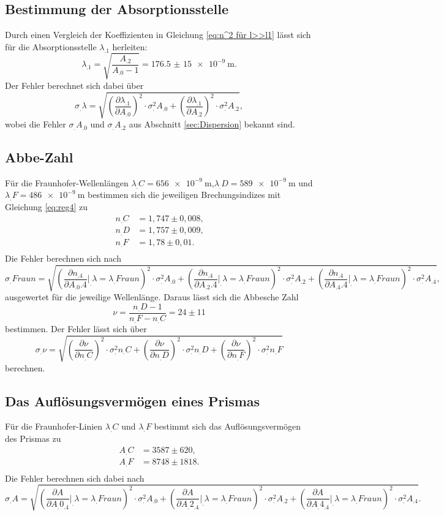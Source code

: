 \subsection{Bestimmung der Absorptionsstelle}

Durch einen Vergleich der Koeffizienten in Gleichung \eqref{eq:n^2 für l>>l1} lässt sich für die Absorptionsstelle $\lambda_.1$ herleiten:
\[
\lambda_.1 = \sqrt{\frac{A_.2}{A_.0-1}}=\SI{176,5(15)e-9}{\metre}\text{.}
\]
Der Fehler berechnet sich dabei über
\[
\sigma_.{\lambda} =\sqrt{\left(\frac{\partial \lambda_.1}{\partial A_.0}\right)^2\cdot\sigma^2_.{A_.0}+\left(\frac{\partial\lambda_.1}{\partial A_.2}\right)^2\cdot\sigma^2_.{A_.2}},
\]
wobei die Fehler $\sigma_.{A_.0}$ und $\sigma_.{A_.2}$ aus Abschnitt \ref{sec:Dispersion} bekannt sind.

\subsection{Abbe-Zahl}
Für die Fraunhofer-Wellenlängen $\lambda_.C=\SI{656e-9}{\metre}$,$\lambda_.D=\SI{589e-9}{\metre}$ und $\lambda_.F=\SI{486e-9}{\metre}$ bestimmen sich die jeweiligen Brechungsindizes mit Gleichung \eqref{eq:reg4} zu
\begin{align*}
n_.C&=1,747\pm 0,008\text{,}\\
n_.D&=1,757\pm 0,009\text{,}\\
n_.F&=1,78\pm 0,01\text{.}\\
\end{align*}
Die Fehler berechnen sich nach
\[
\sigma_.{Fraun}=\sqrt{\left(\frac{\partial n_.4}{\partial A_.0.4}\bigg|_.{\lambda=\lambda_.Fraun}\right)^2\cdot\sigma^2_.{A_.0}+\left(\frac{\partial n_.4}{\partial A_.2.4}\bigg|_.{\lambda=\lambda_.Fraun}\right)^2\cdot\sigma^2_.{A_.2}+\left(\frac{\partial n_.4}{\partial A_.4.4}\bigg|_.{\lambda=\lambda_.Fraun}\right)^2\cdot\sigma^2_.{A_.4}},
\]
ausgewertet für die jeweilige Wellenlänge.
Daraus lässt sich die Abbesche Zahl 
\[
\nu = \frac{n_.D-1}{n_.F-n_.C}=24 \pm 11
\]
bestimmen.
Der Fehler lässt sich über
\[
\sigma_.{\nu}=\sqrt{\left(\frac{\partial\nu}{\partial n_.C}\right)^2\cdot\sigma^2_.{n_.C} + \left(\frac{\partial\nu}{\partial n_.D}\right)^2\cdot\sigma^2_.{n_.D} + \left(\frac{\partial\nu}{\partial n_.F}\right)^2\cdot\sigma^2_.{n_.F}}
\]
berechnen.
\subsection{Das Auflösungsvermögen eines Prismas}
Für die Fraunhofer-Linien $\lambda_.C$ und $\lambda_.F$ bestimmt sich das Auflösungsvermögen des Prismas zu
\begin{align*}
A_.C&=3587\pm 620\text{,}\\
A_.F&=8748\pm 1818\text{.}\\
\end{align*}
Die Fehler berechnen sich dabei nach
\[
\sigma_.A=\sqrt{\left(\frac{\partial A}{\partial A_.{0_.4}}\bigg|_.{\lambda=\lambda_.{Fraun}}\right)^2\cdot\sigma^2_.{A_.0}+\left(\frac{\partial A}{\partial A_.{2_.4}}\bigg|_.{\lambda=\lambda_.{Fraun}}\right)^2\cdot\sigma^2_.{A_.2}+\left(\frac{\partial A}{\partial A_.{4_.4}}\bigg|_.{\lambda=\lambda_.{Fraun}}\right)^2\cdot\sigma^2_.{A_.4}}\text{.}
\]